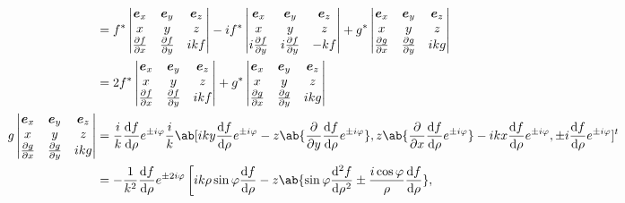 \documentclass[uplatex,dvipdfmx,a4paper,11pt]{jlreq}
\newcommand\vmqty[1]{\begin{vmatrix}#1\end{vmatrix}}
\theoremstyle{definition}
\begin{document}
\begin{align}
                     & = f^*\vmqty{\bm{e}_x                                                                                                                                                                                                                                                             & \bm{e}_y & \bm{e}_z \\ x & y & z \\ \diffp{f}{x} & \diffp{f}{y} & i kf } - i f^*\vmqty{\bm{e}_x                                                                                        & \bm{e}_y & \bm{e}_z \\ x & y & z \\ i\diffp{f}{y} & i\diffp{f}{y} & - kf } + g^*\vmqty{\bm{e}_x                                                                                        & \bm{e}_y & \bm{e}_z \\ x & y & z \\ \diffp{g}{x} & \diffp{g}{y} & i kg } \\
                     & = 2f^*\vmqty{\bm{e}_x                                                                                                                                                                                                                                                            & \bm{e}_y & \bm{e}_z \\ x & y & z \\ \diffp{f}{x} & \diffp{f}{y} & i kf } + g^*\vmqty{\bm{e}_x                                                                                        & \bm{e}_y & \bm{e}_z \\ x & y & z \\ \diffp{g}{x} & \diffp{g}{y} & i kg } \\
  g\vmqty{\bm{e}_x   & \bm{e}_y                                                                                                                                                                                                                                                                         & \bm{e}_z            \\ x & y & z \\ \diffp{g}{x} & \diffp{g}{y} & i kg }
                     & = \frac{i}{k}\diff{f}{\rho}e^{\pm i\varphi}\frac{i}{k}\ab[i ky\diff{f}{\rho}e^{\pm i\varphi} - z\ab\{\diffp{}{y}\diff{f}{\rho}e^{\pm i\varphi}\}, z\ab\{\diffp{}{x}\diff{f}{\rho}e^{\pm i\varphi}\} - i kx\diff{f}{\rho}e^{\pm i\varphi}, \pm i\diff{f}{\rho}e^{\pm i\varphi}]^t                       \\
                     & = -\frac{1}{k^2}\diff{f}{\rho}e^{\pm 2i\varphi}\left[i k\rho\sin\varphi\diff{f}{\rho} - z\ab\{\sin\varphi\diff[2]{f}{\rho} \pm \frac{i\cos\varphi}{\rho}\diff{f}{\rho}\},\right.                                                                                                                       \\

\end{align}
\end{document}
